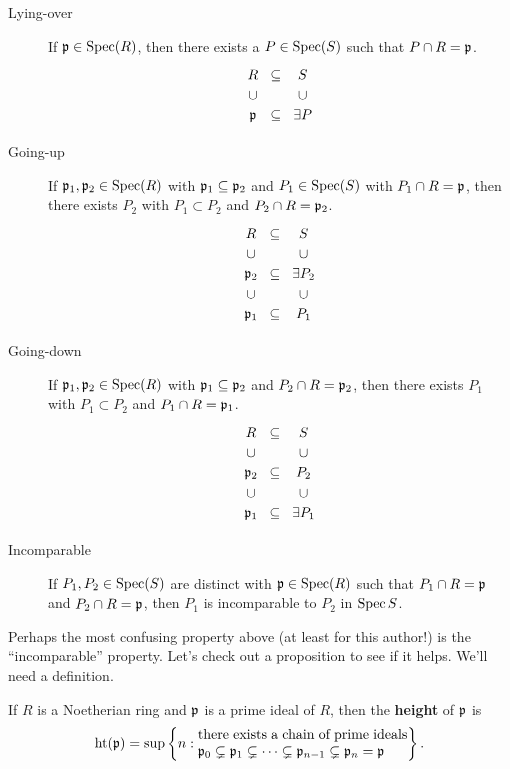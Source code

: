 \documentclass{ximera}
\begin{document}
\begin{description}
\item[Lying-over] If $\mathfrak{p}\in\operatorname{Spec}(R)$, then there exists a
  $P\in\operatorname{Spec}(S)$ such that $P\cap R = \mathfrak{p}$.
  \[
  \begin{tikzcd}[row sep=0em,column sep=0em]
    R    & \subset & S \\
    \cup &         & \cup \\
    \p   & \subset & \exists P
  \end{tikzcd}
  \]
\item[Going-up] If $\mathfrak{p}_1,\mathfrak{p}_2\in\operatorname{Spec}(R)$ with $\mathfrak{p}_1\subseteq\mathfrak{p}_2$ and
  $P_1\in\operatorname{Spec}(S)$ with $P_1\cap R= \mathfrak{p}$, then there exists $P_2$ with
  $P_1\subset P_2$ and $P_2\cap R = \mathfrak{p}_2$.
  \[
  \begin{tikzcd}[row sep=0em,column sep=0em]
    R    & \subset & S \\
    \cup &         & \cup \\
    \p_2 & \subset & \exists P_2 \\
    \cup &         & \cup \\
    \p_1 & \subset & P_1  
  \end{tikzcd}
  \]
\item[Going-down] If $\mathfrak{p}_1,\mathfrak{p}_2\in\operatorname{Spec}(R)$ with $\mathfrak{p}_1\subseteq\mathfrak{p}_2$ and
  $P_2\cap R = \mathfrak{p}_2$, then there exists $P_1$ with $P_1\subset P_2$
  and $P_1\cap R = \mathfrak{p}_1$.
  \[
  \begin{tikzcd}[row sep=0em,column sep=0em]
    R    & \subset & S \\
    \cup &         & \cup \\
    \p_2 & \subset & P_2 \\
    \cup &         & \cup \\
    \p_1 & \subset & \exists P_1  
  \end{tikzcd}
  \]
\item[Incomparable] If $P_1,P_2\in\operatorname{Spec}(S)$ are
  distinct with $\mathfrak{p}\in\operatorname{Spec}(R)$ such that $P_1\cap R= \mathfrak{p}$ and $P_2\cap
  R=\mathfrak{p}$, then $P_1$ is incomparable to $P_2$ in $\operatorname{Spec}{S}$.
\end{description}

Perhaps the most confusing property above (at least for this author!)
is the ``incomparable'' property. Let's check out a proposition to see
if it helps. We'll need a definition.

\begin{definition}
  If $R$ is a Noetherian ring and $\mathfrak{p}$ is a prime ideal of $R$, then the \textbf{height} of $\mathfrak{p}$ is 
  \[
  \h(\p) = \sup\left\{n : \begin{minipage}{15em}there exists a chain of prime ideals $\p_0\subsetneq \p_1 \subsetneq \cdots \subsetneq \p_{n-1}\subsetneq \p_n =\p$\end{minipage} \right\}.
  \]
\end{definition}
\end{document}
